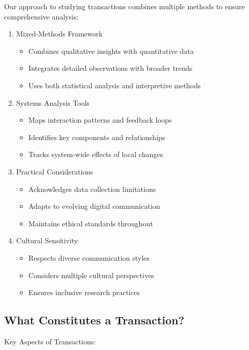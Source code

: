 \documentclass[12pt]{article}
\begin{document}
Our approach to studying transactions combines multiple methods to ensure comprehensive analysis:

\begin{enumerate}
\item Mixed-Methods Framework
\begin{itemize}
\item Combines qualitative insights with quantitative data
\item Integrates detailed observations with broader trends
\item Uses both statistical analysis and interpretive methods
\end{itemize}

\item Systems Analysis Tools
\begin{itemize}
\item Maps interaction patterns and feedback loops
\item Identifies key components and relationships
\item Tracks system-wide effects of local changes
\end{itemize}

\item Practical Considerations
\begin{itemize}
\item Acknowledges data collection limitations
\item Adapts to evolving digital communication
\item Maintains ethical standards throughout
\end{itemize}

\item Cultural Sensitivity
\begin{itemize}
\item Respects diverse communication styles
\item Considers multiple cultural perspectives
\item Ensures inclusive research practices
\end{itemize}
\end{enumerate}

\subsection{What Constitutes a Transaction?}

Key Aspects of Transactions:
\end{document}
